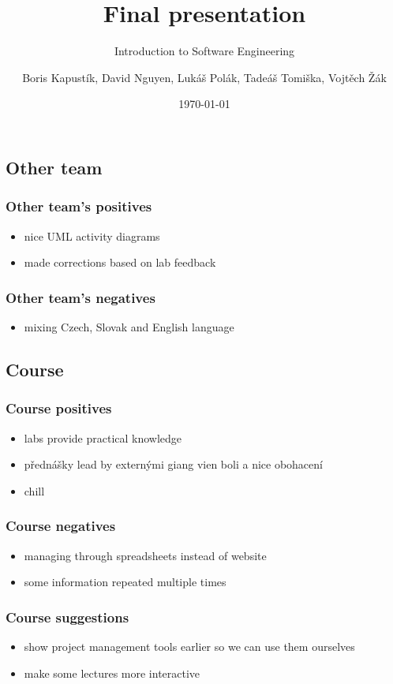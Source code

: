 \documentclass{beamer}
\title{Final presentation}
\subtitle{Introduction to Software Engineering}
\author[Kapustík, Nguyen, Polák, Tomiška, Žák]{Boris Kapustík, David Nguyen, Lukáš Polák, Tadeáš Tomiška, Vojtěch Žák}
\institute[]{Faculty of Mathematics and Physics, Charles University}
\date{\today}
\begin{document}

\begin{frame}
	\titlepage
\end{frame}

\subsection{Other team}
\begin{frame}
	\frametitle{Other team's positives}
	\begin{itemize}
		\item nice UML activity diagrams
		\item made corrections based on lab feedback
	\end{itemize}
\end{frame}

\begin{frame}
	\frametitle{Other team's negatives}
	\begin{itemize}
		\item mixing Czech, Slovak and English language
	\end{itemize}
\end{frame}

\subsection{Course}
\begin{frame}
	\frametitle{Course positives}
	\begin{itemize}
		\item labs provide practical knowledge
		\item přednášky lead by externými giang vien boli a nice obohacení
		\item chill
	\end{itemize}
\end{frame}

\begin{frame}
	\frametitle{Course negatives}
	\begin{itemize}
		\item managing through spreadsheets instead of website
		\item some information repeated multiple times
	\end{itemize}
\end{frame}

\begin{frame}
	\frametitle{Course suggestions}
	\begin{itemize}
		\item show project management tools earlier so we can use them ourselves
		\item make some lectures more interactive
	\end{itemize}
\end{frame}
\end{document}

